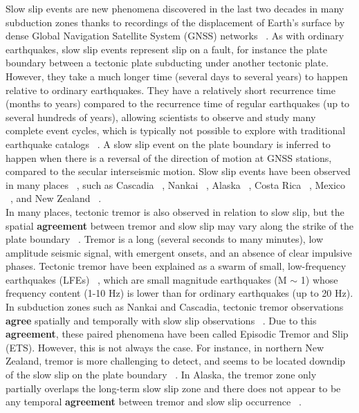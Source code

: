 \documentclass{article}
\begin{document}
Slow slip events are new phenomena discovered in the last two decades in many subduction zones thanks to recordings of the displacement of Earth's surface by dense Global Navigation Satellite System (GNSS) networks ~\citep{VER_2010,SCH_2010,JIA_2012,WAL_2012}. As with ordinary earthquakes, slow slip events represent slip on a fault, for instance the plate boundary between a tectonic plate subducting under another tectonic plate. However, they take a much longer time (several days to several years) to happen relative to ordinary earthquakes. They have a relatively short recurrence time (months to years) compared to the recurrence time of regular earthquakes (up to several hundreds of years), allowing scientists to observe and study many complete event cycles, which is typically not possible to explore with traditional earthquake catalogs ~\citep{BER_2011}. A slow slip event on the plate boundary is inferred to happen when there is a reversal of the direction of motion at GNSS stations, compared to the secular interseismic motion. Slow slip events have been observed in many places ~\citep{BER_2011,AUD_2016}, such as Cascadia ~\citep{BAR_2020}, Nankai ~\citep{NIS_2013}, Alaska ~\citep{LI_2016}, Costa Rica ~\citep{JIA_2012}, Mexico ~\citep{RAD_2012}, and New Zealand ~\citep{WAL_2020}. \\

In many places, tectonic tremor is also observed in relation to slow slip, but the spatial \textbf{agreement} between tremor and slow slip may vary along the strike of the plate boundary ~\citep{HAL_2018}. Tremor is a long (several seconds to many minutes), low amplitude seismic signal, with emergent onsets, and an absence of clear impulsive phases. Tectonic tremor have been explained as a swarm of small, low-frequency earthquakes (LFEs) ~\citep{SHE_2007_nature}, which are small magnitude earthquakes (M $\sim$ 1) whose frequency content (1-10 Hz) is lower than for ordinary earthquakes (up to 20 Hz). In subduction zones such as Nankai and Cascadia, tectonic tremor observations \textbf{agree} spatially and temporally with slow slip observations ~\citep{ROG_2003,OBA_2004}. Due to this \textbf{agreement}, these paired phenomena have been called Episodic Tremor and Slip (ETS). However, this is not always the case. For instance, in northern New Zealand, tremor is more challenging to detect, and seems to be located downdip of the slow slip on the plate boundary ~\citep{TOD_2016}. In Alaska, the tremor zone only partially overlaps the long-term slow slip zone and there does not appear to be any temporal \textbf{agreement} between tremor and slow slip occurrence ~\citep{WEC_2016}. \\
\end{document}
